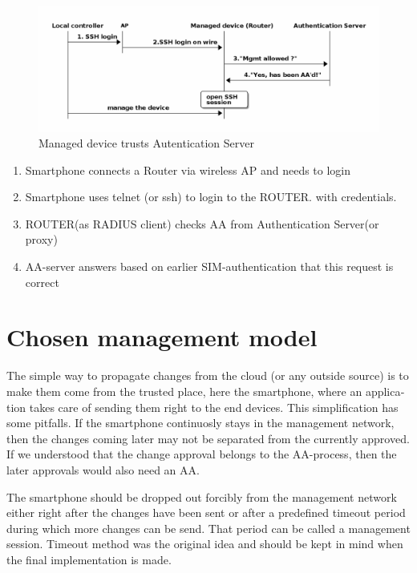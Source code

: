 \documentclass[12pt,a4paper,english]{tutthesis}
\begin{document}
\begin{otherlanguage}{english}
\begin{figure}[htb]
\centering
\includegraphics[width=.9\linewidth]{trust-register.png}
\caption{\label{fig:trust-register}Managed device trusts Autentication Server}
\end{figure}





\begin{enumerate}
\item Smartphone connects a Router via wireless AP and needs to login
\item Smartphone uses telnet (or ssh) to login to the ROUTER.
with credentials.
\item ROUTER(as RADIUS client) checks AA from Authentication Server(or 
proxy)
\item AA-server answers based on earlier SIM-authentication that this
request is correct
\end{enumerate}



\section{Chosen management model}
\label{sec-4-5}





The simple way to propagate changes from the cloud (or any outside
source) is to make them come from the trusted place, here the smartphone,
where an application takes care of sending them right to the end
devices. This simplification has some pitfalls. If the smartphone continuosly stays
in the management network, then the changes coming later may not be 
separated from the currently approved.
If we understood that the change approval belongs to the AA-process, then
the later approvals would also need an AA.

 The smartphone should be dropped out forcibly from the management
network either right after the changes have been sent or after a
predefined timeout period during which more changes can be send.  That
period can be called a management session.  Timeout method was the
original idea and should be kept in mind when the final implementation
is made.


\end{otherlanguage}
\end{document}

